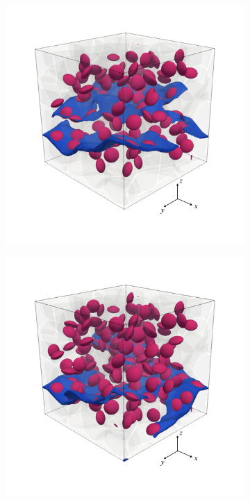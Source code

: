 \begin{figure}[!htb]
\begin{subfigure}{0.32\textwidth}
    \caption{}
    \label{b50_end}
  \end{subfigure}
  \begin{subfigure}{0.32\textwidth}
    \centering
    \includegraphics[width=\textwidth]{Chapter3/figures/b100_end}
    \caption{}
    \label{b100_end}
  \end{subfigure}
  \begin{subfigure}{0.32\textwidth}
    \centering
    \includegraphics[width=\textwidth]{Chapter3/figures/b150_end}

\end{subfigure}
\end{figure}
